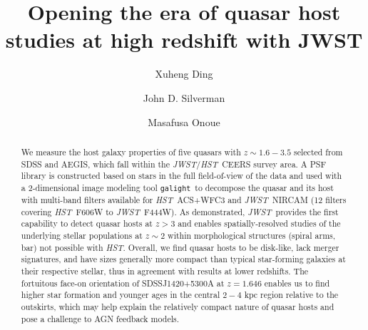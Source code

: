 \documentclass[twocolumn]{aastex631}
\newcommand{\galight}{\texttt{galight}}
\newcommand{\hst}{{\it HST}}
\newcommand{\jwst}{{\it JWST}}
\begin{document}
\title{Opening the era of quasar host studies at high redshift with JWST}

\author[0000-0002-0786-7307]{Xuheng Ding}

\author[0000-0002-0000-6977]{John D. Silverman}

\author[0000-0003-2984-6803]{Masafusa Onoue}


\begin{abstract}
We measure the host galaxy properties of five quasars with $z\sim 1.6 - 3.5$ selected from SDSS and AEGIS, which fall within the \jwst/\hst\ CEERS survey area. A PSF library is constructed based on stars in the full field-of-view of the data and used with a 2-dimensional image modeling tool \galight\ to decompose the quasar and its host with multi-band filters available for \hst\ ACS+WFC3 and \jwst\ NIRCAM (12 filters covering \hst\ F606W to \jwst\ F444W). As demonstrated, \jwst\ provides the first capability to detect quasar hosts at $z>3$ and enables spatially-resolved studies of the underlying stellar populations at $z\sim2$ within morphological structures (spiral arms, bar) not possible with \hst. Overall, we find quasar hosts to be disk-like, lack merger signatures, and have sizes generally more compact than typical star-forming galaxies at their respective stellar, thus in agreement with results at lower redshifts. The fortuitous face-on orientation of SDSSJ1420+5300A at $z = 1.646$ enables us to find higher star formation and younger ages in the central $2-4$ kpc region relative to the outskirts, which may help explain the relatively compact nature of quasar hosts and pose a challenge to AGN feedback models.

\end{abstract}
\end{document}
